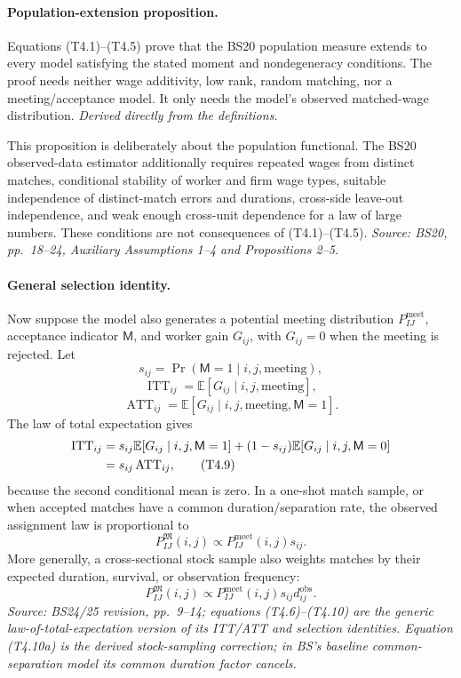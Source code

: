 \documentclass[11pt]{article}
\begin{document}
\paragraph{Population-extension proposition.}
Equations (T4.1)--(T4.5) prove that the BS20 population measure extends to
every model satisfying the stated moment and nondegeneracy conditions.  The
proof needs neither wage additivity, low rank, random matching, nor a
meeting/acceptance model.  It only needs the model's observed matched-wage
distribution.
\textit{Derived directly from the definitions.}

This proposition is deliberately about the population functional.  The BS20
observed-data estimator additionally requires repeated wages from distinct
matches, conditional stability of worker and firm wage types, suitable
independence of distinct-match errors and durations, cross-side leave-out
independence, and weak enough cross-unit dependence for a law of large
numbers.  These conditions are not consequences of (T4.1)--(T4.5).
\textit{Source: BS20, pp.\ 18--24, Auxiliary Assumptions 1--4 and
Propositions 2--5.}

\paragraph{General selection identity.}
Now suppose the model also generates a potential meeting distribution
\(P^{\mathrm{meet}}_{IJ}\), acceptance indicator \(\mathsf M\), and worker
gain \(G_{ij}\), with \(G_{ij}=0\) when the meeting is rejected.  Let
\[
s_{ij}
=
\Pr(\mathsf M=1\mid i,j,\text{meeting}),
\tag{T4.6}
\]
\[
\operatorname{ITT}_{ij}
=
\mathbb E[G_{ij}\mid i,j,\text{meeting}],
\tag{T4.7}
\]
\[
\operatorname{ATT}_{ij}
=
\mathbb E[G_{ij}\mid i,j,\text{meeting},\mathsf M=1].
\tag{T4.8}
\]
The law of total expectation gives
\begin{align}
\operatorname{ITT}_{ij}
&=
s_{ij}
\mathbb E[G_{ij}\mid i,j,\mathsf M=1]
+(1-s_{ij})
\mathbb E[G_{ij}\mid i,j,\mathsf M=0] \notag\\
&=
s_{ij}\operatorname{ATT}_{ij},
\tag{T4.9}
\end{align}
because the second conditional mean is zero.  In a one-shot match sample, or
when accepted matches have a common duration/separation rate, the observed
assignment law is proportional to
\[
P^{\mathfrak M}_{IJ}(i,j)
\propto
P^{\mathrm{meet}}_{IJ}(i,j)s_{ij}.
\tag{T4.10}
\]
More generally, a cross-sectional stock sample also weights matches by their
expected duration, survival, or observation frequency:
\[
P^{\mathfrak M}_{IJ}(i,j)
\propto
P^{\mathrm{meet}}_{IJ}(i,j)s_{ij}d_{ij}^{\mathrm{obs}}.
\tag{T4.10a}
\]
\textit{Source: BS24/25 revision, pp.\ 9--14; equations (T4.6)--(T4.10)
are the generic law-of-total-expectation version of its ITT/ATT and selection
identities.  Equation (T4.10a) is the derived stock-sampling correction; in
BS's baseline common-separation model its common duration factor cancels.}
\end{document}
